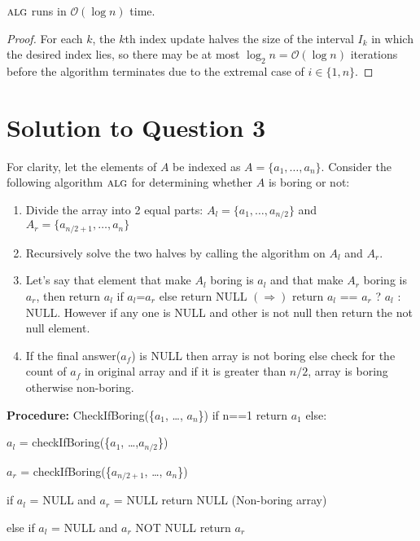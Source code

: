 \documentclass[11pt]{article}
\renewcommand{\O}{\mathcal{O}}
\newcommand{\alg}{\textsc{alg}}
\begin{document}
 $\alg$ runs in $\O(\log n)$ time.

\begin{proof}
  For each $k$, the $k$th index update halves the size of the interval $I_k$ in which the desired index lies, so there may be at most $\log_{2}n = \O(\log n)$ iterations before the algorithm terminates due to the extremal case of $i \in \{1, n\}$.
\end{proof}

\section{Solution to Question 3}

For clarity, let the elements of $A$ be indexed as $A = \{a_1, \dots, a_n\}$.
Consider the following algorithm $\alg$ for determining whether $A$ is boring or not:
\begin{enumerate}
  \item Divide the array into 2 equal parts: $A_l = \{a_1, \dots, a_{n/2}\}$ and $A_r = \{a_{n/2+1}, \dots, a_n\}$
  \item Recursively solve the two halves by calling the algorithm on $A_l$ and $A_r$.
  \item Let's say that element that make $A_l$ boring is $a_l$ and that make $A_r$ boring is $a_r$, then return $a_l$ if $a_l$=$a_r$ else
return NULL \newline
  $(\Rightarrow)$ return $a_l$ == $a_r$ ? $a_l$ : NULL. 
However if any one is NULL and other is not null then return the not null element.
\item If the final answer($a_f$) is NULL then array is not boring else check for the count of $a_f$ in original array and if it is greater than
$n/2$, array is boring otherwise non-boring.
\end{enumerate}
{\bf Procedure:}\newline
CheckIfBoring(\{$a_1$, \dots, $a_n$\}) \newline
if n==1 return $a_1$ \newline
\newline
else:

 $a_l$ = checkIfBoring(\{$a_1$, \dots,$a_{n/2}$\}) 

 $a_r$ = checkIfBoring(\{$a_{n/2+1}$, \dots, $a_n$\}) 

 if $a_l$ = NULL and $a_r$ = NULL return NULL (Non-boring array) 

else if $a_l$ = NULL and $a_r$ NOT NULL return $a_r$ 
\end{document}
